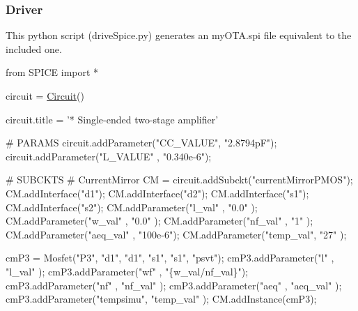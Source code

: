 \hypertarget{spice_spiceDrivePython}{}\subsubsection{Driver}\label{spice_spiceDrivePython}
This python script ({\ttfamily drive\+Spice.\+py}) generates an my\+O\+T\+A.\+spi file equivalent to the included one. 
\begin{DoxyCodeInclude}
\textcolor{keyword}{from} SPICE \textcolor{keyword}{import} *

circuit = \mbox{\hyperlink{class_circuit}{Circuit}}()

circuit.title = \textcolor{stringliteral}{'* Single-ended two-stage amplifier'}

\textcolor{comment}{# PARAMS}
circuit.addParameter(\textcolor{stringliteral}{"CC\_VALUE"}, \textcolor{stringliteral}{"2.8794pF"});
circuit.addParameter(\textcolor{stringliteral}{"L\_VALUE"} , \textcolor{stringliteral}{"0.340e-6"});

\textcolor{comment}{# SUBCKTS}
\textcolor{comment}{# CurrentMirror}
CM = circuit.addSubckt(\textcolor{stringliteral}{"currentMirrorPMOS"});
CM.addInterface(\textcolor{stringliteral}{"d1"});
CM.addInterface(\textcolor{stringliteral}{"d2"});
CM.addInterface(\textcolor{stringliteral}{"s1"});
CM.addInterface(\textcolor{stringliteral}{"s2"});
CM.addParameter(\textcolor{stringliteral}{"l\_val"}   , \textcolor{stringliteral}{"0.0"}   );
CM.addParameter(\textcolor{stringliteral}{"w\_val"}   , \textcolor{stringliteral}{"0.0"}   );
CM.addParameter(\textcolor{stringliteral}{"nf\_val"}  , \textcolor{stringliteral}{"1"}     );
CM.addParameter(\textcolor{stringliteral}{"aeq\_val"} , \textcolor{stringliteral}{"100e-6"});
CM.addParameter(\textcolor{stringliteral}{"temp\_val"}, \textcolor{stringliteral}{"27"}    );

cmP3 = Mosfet(\textcolor{stringliteral}{"P3"}, \textcolor{stringliteral}{"d1"}, \textcolor{stringliteral}{"d1"}, \textcolor{stringliteral}{"s1"}, \textcolor{stringliteral}{"s1"}, \textcolor{stringliteral}{"psvt"});
cmP3.addParameter(\textcolor{stringliteral}{"l"}       , \textcolor{stringliteral}{"l\_val"}         );
cmP3.addParameter(\textcolor{stringliteral}{"wf"}      , \textcolor{stringliteral}{"\{w\_val/nf\_val\}"});
cmP3.addParameter(\textcolor{stringliteral}{"nf"}      , \textcolor{stringliteral}{"nf\_val"}        );
cmP3.addParameter(\textcolor{stringliteral}{"aeq"}     , \textcolor{stringliteral}{"aeq\_val"}       );
cmP3.addParameter(\textcolor{stringliteral}{"tempsimu"}, \textcolor{stringliteral}{"temp\_val"}      );
CM.addInstance(cmP3);


\end{DoxyCodeInclude}
